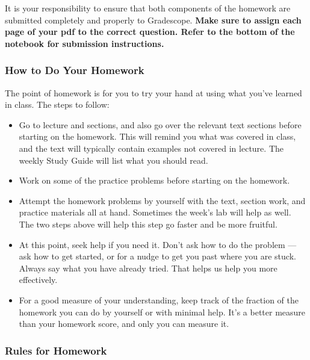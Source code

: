 \documentclass[11pt]{article}
\providecommand{\tightlist}{%
      \setlength{\itemsep}{0pt}\setlength{\parskip}{0pt}}
\begin{document}
It is your responsibility to ensure that both components of the homework
are submitted completely and properly to Gradescope. \textbf{Make sure
to assign each page of your pdf to the correct question. Refer to the
bottom of the notebook for submission instructions.}

    \hypertarget{how-to-do-your-homework}{%
\subsubsection{How to Do Your Homework}\label{how-to-do-your-homework}}

The point of homework is for you to try your hand at using what you've
learned in class. The steps to follow:

\begin{itemize}
\tightlist
\item
  Go to lecture and sections, and also go over the relevant text
  sections before starting on the homework. This will remind you what
  was covered in class, and the text will typically contain examples not
  covered in lecture. The weekly Study Guide will list what you should
  read.
\item
  Work on some of the practice problems before starting on the homework.
\item
  Attempt the homework problems by yourself with the text, section work,
  and practice materials all at hand. Sometimes the week's lab will help
  as well. The two steps above will help this step go faster and be more
  fruitful.
\item
  At this point, seek help if you need it. Don't ask how to do the
  problem --- ask how to get started, or for a nudge to get you past
  where you are stuck. Always say what you have already tried. That
  helps us help you more effectively.
\item
  For a good measure of your understanding, keep track of the fraction
  of the homework you can do by yourself or with minimal help. It's a
  better measure than your homework score, and only you can measure it.
\end{itemize}

    \hypertarget{rules-for-homework}{%
\subsubsection{Rules for Homework}\label{rules-for-homework}}
\end{document}
